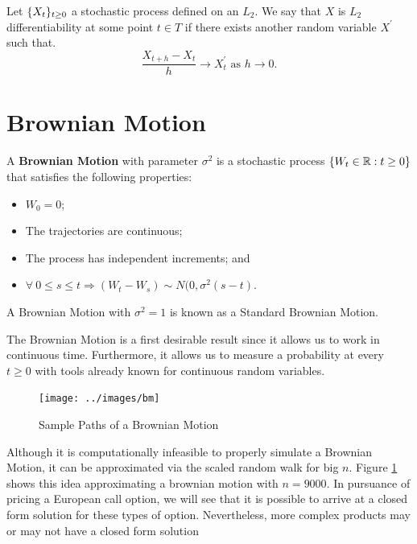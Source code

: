 \documentclass[../TGMAFFIRO]{subfiles}
\begin{document}
\begin{definition}[$L_2$ differentiability]
Let $\{X_t\}_{t\geq 0}$ a stochastic process defined on an $L_2$. We say that $X$ is $L_2$ differentiability at some point $t\in T$ if there exists another random variable $X^\prime$ such that.
\begin{equation}
	\frac{X_{t+h}- X_t}{h} \to X^\prime_t \text{ as } h\to 0.
\end{equation}
\end{definition}

\section{Brownian Motion}
\begin{definition}\label{def:brownian_motion}
	A \textbf{Brownian Motion} with parameter $\sigma^2$ is a stochastic process $\{W_t \in \mathbb{R}:t\geq 0\}$ that satisfies the following properties:
	\begin{itemize}
		\item $W_0 = 0$;
		\item The trajectories are continuous; 
		\item The process has independent increments; and
		\item $\forall \ 0 \leq s \leq t \Longrightarrow (W_t - W_s) \sim N(0, \sigma^2(s - t)$.
	\end{itemize}
\end{definition}

\begin{remark}
	A Brownian Motion with $\sigma^2 = 1$ is known as a Standard Brownian Motion.
\end{remark}

The Brownian Motion is a first desirable result since it allows us to work in continuous time. Furthermore, it allows us to measure a probability at every $t\geq 0$ with tools already known for continuous random variables. 

\begin{figure}[h]
	\centering
	\texttt{[image: ../images/bm]}
	\caption{Sample Paths of a Brownian Motion}
	\label{fig:Brownian_Motion}
\end{figure}

Although it is computationally infeasible to properly simulate a Brownian Motion, it can be approximated via the scaled random walk for big $n$. Figure \ref{fig:Brownian_Motion} shows this idea approximating a brownian motion with $n=9000$. In pursuance of pricing a European call option, we will see that it is possible to arrive at a closed form solution for these types of option. Nevertheless, more complex products may or may not have a closed form solution\\
\end{document}
